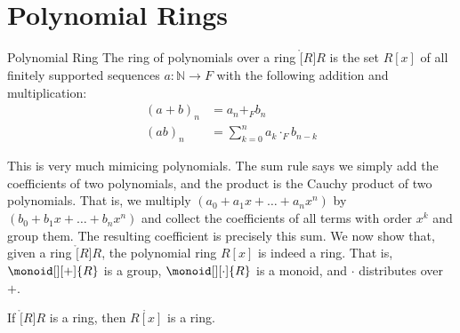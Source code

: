 \section{Polynomial Rings}
    \begin{fdefinition}{Polynomial Ring}
        The ring of polynomials over a ring $\ring[R]{R}$ is the set $R[x]$
        of all finitely supported sequences $a:\mathbb{N}\rightarrow{F}$
        with the following addition and multiplication:
        \begin{align}
            (a+b)_{n}&=a_{n}+_{F}b_{n}\\
            (ab)_{n}&=\sum_{k=0}^{n}a_{k}\cdot_{F}b_{n-k}
        \end{align}
    \end{fdefinition}
    This is very much mimicing polynomials. The sum rule says we simply add
    the coefficients of two polynomials, and the product is the Cauchy
    product of two polynomials. That is, we multiply
    $(a_{0}+a_{1}x+\dots+a_{n}x^{n})$ by $(b_{0}+b_{1}x+\dots+b_{n}x^{n})$
    and collect the coefficients of all terms with order $x^{k}$ and group
    them. The resulting coefficient is precisely this sum. We now show that,
    given a ring $\ring[R]{R}$, the polynomial ring $R[x]$ is indeed a ring.
    That is, $\monoid[][+]{R}$ is a group, $\monoid[][\cdot]{R}$ is a
    monoid, and $\cdot$ distributes over $+$.
    \begin{theorem}
        If $\ring[R]{R}$ is a ring, then $\ring{R[x]}$ is a ring.
    \end{theorem}
